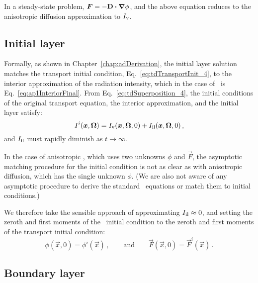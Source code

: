 In a steady-state problem, $\bm{F} = -\mathbf{D} \bm{\cdot} \bm{\nabla} \phi$, and the above
equation reduces to the anisotropic diffusion approximation to $I_\mathrm{v}$.

\subsection{Initial layer}

Formally, as shown in Chapter~\ref{chap:adDerivation}, the initial layer
solution matches the transport initial condition,
Eq.~\eqref{eq:tdTransportInit_4}, to the interior approximation of the radiation
intensity, which in the case of \APone\ is Eq.~\eqref{eq:ap1InteriorFinal}. From
Eq.~\eqref{eq:tdSuperposition_4}, the initial conditions of the original transport
equation, the interior approximation, and the initial layer satisfy:
\begin{equation*}
  I^i(\bm{x},\bm{\Omega})
  = I_\mathrm{v}(\bm{x},\bm{\Omega},0) + I_\mathrm{il}(\bm{x},\bm{\Omega},0)\,,
\end{equation*}
and $I_\mathrm{il}$ must rapidly diminish as $t\to\infty$.

In the case of anisotropic \Pone, which uses two unknowns $\phi$ and
$\vec{F}$, the asymptotic matching procedure for the initial condition is not as
clear as with anisotropic diffusion, which has the single unknown $\phi$. (We
are also not aware of any asymptotic procedure to derive the standard \Pone\
equations or match them to initial conditions.)

We therefore take the sensible approach of approximating $I_\mathrm{il}\approx0$, and
setting the zeroth and first moments of the \APone\ initial condition to the
zeroth and first moments of the transport initial condition:
\begin{equation}\label{eq:ap1init}
  \phi(\vec{x},0) = \phi^i(\vec{x}) \,,\qquad\text{and}\qquad
  \vec{F}(\vec{x},0) = \vec{F}^i(\vec{x}) \,.
\end{equation}

\subsection{Boundary layer}

